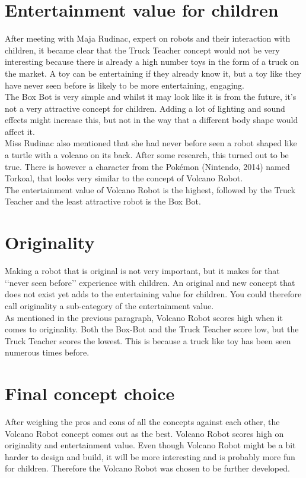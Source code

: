 \documentclass[11pt,twoside,a4paper]{report}
\begin{document}
\section{Entertainment value for children}
After meeting with Maja Rudinac, expert on robots and their interaction with children, it became clear that the Truck Teacher concept would not be very interesting because there is already a high number toys in the form of a truck on the market. A toy can be entertaining if they already know it, but a toy like they have never seen before is likely to be more entertaining, engaging. \\
The Box Bot is very simple and whilst it may look like it is from the future, it\rq{}s not a very attractive concept for children. Adding a lot of lighting and sound effects might increase this, but not in the way that a different body shape would affect it.\\
Miss Rudinac also mentioned that she had never before seen a robot shaped like a turtle with a volcano on its back. After some research, this turned out to be true. There is however a character from the Pok\'{e}mon (Nintendo, 2014) named Torkoal, that looks very similar to the concept of Volcano Robot.\\
The entertainment value of Volcano Robot is the highest, followed by the Truck Teacher and the least attractive robot is the Box Bot.
\section{Originality}
Making a robot that is original is not very important, but it makes for that \lq\lq{}never seen before\rq\rq{} experience with children. An original and new concept that does not exist yet adds to the entertaining value for children. You could therefore call originality a sub-category of the entertainment value.\\
As mentioned in the previous paragraph, Volcano Robot scores high when it comes to originality. Both the Box-Bot and the Truck Teacher score low, but the Truck Teacher scores the lowest. This is because a truck like toy has been seen numerous times before.
\section{Final concept choice}
After weighing the pros and cons of all the concepts against each other, the Volcano Robot concept comes out as the best. Volcano Robot scores high on originality and entertainment value. Even though Volcano Robot might be a bit harder to design and build, it will be more interesting and is probably more fun for children. Therefore the Volcano Robot was chosen to be further developed.
\end{document}
